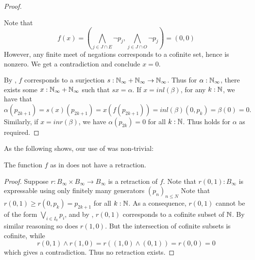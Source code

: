 \begin{proof}
\begin{itemize}
      Note that   
      $$f(x) = (\bigwedge_{j\in J \cap E } \neg p_j , \bigwedge_{j\in J \cap O } \neg p_j ) = (0,0)$$
      However, any finite meet of negations corresponds to a cofinite set, hence is nonzero. 
      We get a contradiction and conclude $x=0$. 
  \end{itemize}
  By ,
  $f$ corresponds to a surjection 
  $s:\mathbb{N}_{\infty} + \mathbb{N}_{\infty} \to \mathbb{N}_{\infty}$.
  Thus for $\alpha : \mathbb{N}_{\infty}$, 
  there exists some $x:\mathbb{N}_{\infty} + \mathbb{N}_{\infty}$ such that $s x = \alpha$. 
  If $x = inl(\beta)$, 
  for any $k:\mathbb{N}$, we have that 
  $$\alpha (p_{2k+1}) = s(x) (p_{2k+1}) = x(f(p_{2k+1})) = inl(\beta) (0,p_k)  = \beta(0) = 0.$$
  Similarly, if $x = inr(\beta)$, we have $\alpha(p_{2k}) = 0$ for all $k:\mathbb{N}$. 
  Thus  holds for $\alpha$ as required. 
\end{proof}
As the following shows, our use of  was non-trivial: 
\begin{lemma}
  The function $f$  as in  does not have a retraction. 
\end{lemma}
\begin{proof}
  Suppose $r:B_\infty \times B_\infty \to B_\infty$ is a retraction of $f$. 
  Note that $r(0,1):B_\infty$ is expressable using only finitely many generators $(p_n)_{n\leq N}$
  Note that $r(0,1) \geq r(0,p_k) = p_{2k+1}$ for all $k:\mathbb{N}$. 
  As a consequence, $r(0,1)$ cannot be of the form $\bigvee_{i\in I_0} p_i$, and by , 
  $r(0,1)$ corresponds to a cofinite subset of $\mathbb{N}$. %
  By similar reasoning so does $r(1,0)$.%
  But the intersection of cofinite subsets is cofinite, while 
  $$r(0,1) \wedge r(1,0) = r( (1,0) \wedge (0,1)) = r(0,0) = 0$$
  which gives a contradiction. Thus no retraction exists. 
\end{proof}

